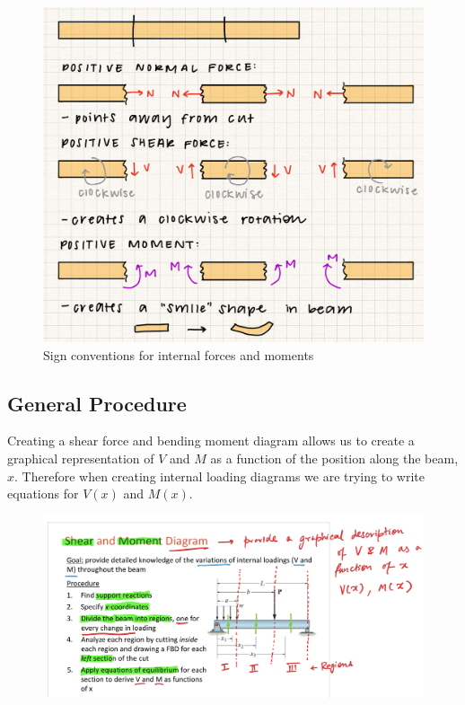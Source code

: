 \begin{figure}[!h]
\centering
\includegraphics[angle=0, width=\textwidth]{IntForceFigures/SignConventions.jpg}
\vspace{-2mm}
\caption{\small Sign conventions for internal forces and moments}
\vspace{-3mm}
\label{Fig:SignConventions}
\end{figure}


\subsection{General Procedure}

Creating a shear force and bending moment diagram allows us to create a graphical representation of $V$ and $M$ as a function of the position along the beam, $x$. Therefore when creating internal loading diagrams we are trying to write equations for $V(x)$ and $M(x)$.

\begin{figure}[!h]
\centering
\includegraphics[angle=0, width=\textwidth]{IntForceFigures/DiagramProcedure.png}
\vspace{-2mm}
\caption{\small {}}
\vspace{-3mm}
\label{Fig:DiagramProcedure}
\end{figure}

